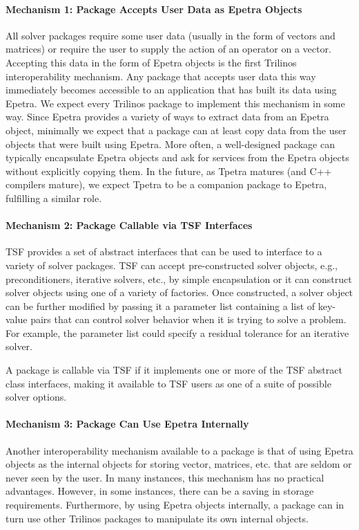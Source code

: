 \documentclass[acmtoms,acmnow]{acmtrans2m}
\begin{document}
\paragraph*{Mechanism 1: Package Accepts User Data as Epetra Objects}
All solver packages require some user data (usually in the form of
vectors and matrices) or require the user to supply the action of an
operator on a vector.  Accepting this data in the form of Epetra
objects is the first Trilinos interoperability mechanism.  Any package
that accepts user data this way immediately becomes accessible to an
application that has built its data using Epetra.  We expect every
Trilinos package to implement this mechanism in some way.  Since
Epetra provides a variety of ways to extract data from an Epetra
object, minimally we expect that a package can at least copy data from
the user objects that were built using Epetra.  More often, a well-designed
package can typically encapsulate Epetra objects and ask for services from
the Epetra objects without explicitly copying them.  In the future, as
Tpetra matures (and C++ compilers mature), we expect Tpetra to be a
companion package to Epetra, fulfilling a similar role.

\paragraph*{Mechanism 2: Package Callable via TSF Interfaces}
TSF provides a set of abstract interfaces that can be used to
interface to a variety of solver packages.  TSF can accept
pre-constructed solver objects, e.g., preconditioners, iterative
solvers, etc., by simple encapsulation or it can
construct solver objects using one of a variety of factories.  Once
constructed, a solver object can be further modified by passing it a
parameter list containing a list of key-value pairs that can control
solver behavior when it is trying to solve a problem.  For example,
the parameter list could specify a residual tolerance for an iterative solver.

A package is callable via TSF if it implements one or more of the TSF
abstract class interfaces, making it available to TSF users as one of a
suite of possible solver options.

\paragraph*{Mechanism 3: Package Can Use Epetra Internally}

Another interoperability mechanism available to a package is that of
using Epetra objects as the
internal objects for storing vector, matrices, etc. that are seldom or
never seen by the user.  In many instances, this mechanism has no
practical advantages.  However, in some instances, there can be a
saving in storage requirements.  Furthermore, by using Epetra objects
internally, a package can in turn use other Trilinos packages to
manipulate its own internal objects.
\end{document}
